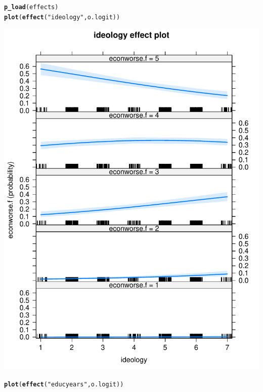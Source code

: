 \documentclass[onesided]{article}\usepackage[]{graphicx}\usepackage[]{color}
\makeatletter
\def\maxwidth{ %
  \ifdim\Gin@nat@width>\linewidth
    \linewidth
  \else
    \Gin@nat@width
  \fi
}
\newcommand{\hlstr}[1]{\textcolor[rgb]{0.192,0.494,0.8}{#1}}%
\newcommand{\hlstd}[1]{\textcolor[rgb]{0.345,0.345,0.345}{#1}}%
\newcommand{\hlkwd}[1]{\textcolor[rgb]{0.737,0.353,0.396}{\textbf{#1}}}%
\newenvironment{kframe}{%
 \def\at@end@of@kframe{}%
 \ifinner\ifhmode%
  \def\at@end@of@kframe{\end{minipage}}%
  \begin{minipage}{\columnwidth}%
 \fi\fi%
 \def\FrameCommand##1{\hskip\@totalleftmargin \hskip-\fboxsep
 \colorbox{shadecolor}{##1}\hskip-\fboxsep
     \hskip-\linewidth \hskip-\@totalleftmargin \hskip\columnwidth}%
 \MakeFramed {\advance\hsize-\width
   \@totalleftmargin\z@ \linewidth\hsize
   \@setminipage}}%
 {\par\unskip\endMakeFramed%
 \at@end@of@kframe}
\newenvironment{knitrout}{}{} %
\makeatother
\begin{document}
\begin{knitrout}
\color{fgcolor}\begin{kframe}
\begin{alltt}
\hlkwd{p_load}\hlstd{(effects)}
\hlkwd{plot}\hlstd{(}\hlkwd{effect}\hlstd{(}\hlstr{"ideology"}\hlstd{, o.logit))}
\end{alltt}
\end{kframe}

{\centering \includegraphics[width=\maxwidth]{figure/pp-1} 

}


\begin{kframe}\begin{alltt}
\hlkwd{plot}\hlstd{(}\hlkwd{effect}\hlstd{(}\hlstr{"educyears"}\hlstd{, o.logit))}
\end{alltt}
\end{kframe}


\end{knitrout}
\end{document}
